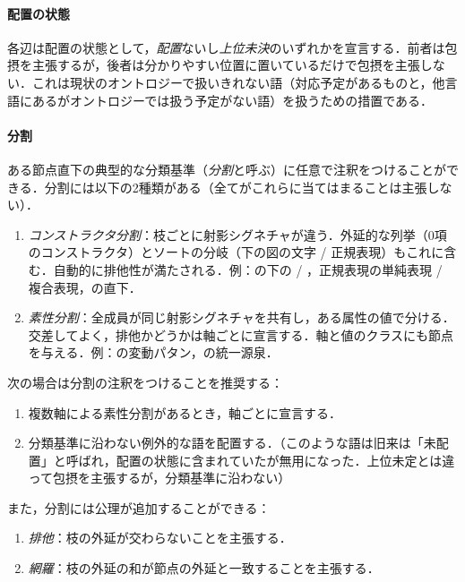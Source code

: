 \documentclass[../../main-detail.tex]{subfiles}
\begin{document}
\paragraph{配置の状態} 各辺は配置の状態として，\emph{配置}ないし\emph{上位未決}のいずれかを宣言する．前者は包摂を主張するが，後者は分かりやすい位置に置いているだけで包摂を主張しない．これは現状のオントロジーで扱いきれない語（対応予定があるものと，他言語にあるがオントロジーでは扱う予定がない語）を扱うための措置である．

\paragraph{分割} ある節点直下の典型的な分類基準（\emph{分割}と呼ぶ）に任意で注釈をつけることができる．分割には以下の2種類がある（全てがこれらに当てはまることは主張しない）．
\begin{enumerate}
    \item \emph{コンストラクタ分割}：枝ごとに射影シグネチャが違う．外延的な列挙（0項のコンストラクタ）とソートの分岐（下の図の文字 / 正規表現）もこれに含む．自動的に排他性が満たされる．例：の下の / ，正規表現の単純表現 / 複合表現，の直下．
    \item \emph{素性分割}：全成員が同じ射影シグネチャを共有し，ある属性の値で分ける．交差してよく，排他かどうかは軸ごとに宣言する．軸と値のクラスにも節点を与える．例：の変動パタン，の統一源泉．
\end{enumerate}
次の場合は分割の注釈をつけることを推奨する：
\begin{enumerate}
    \item 複数軸による素性分割があるとき，軸ごとに宣言する．
    \item 分類基準に沿わない例外的な語を配置する．（このような語は旧来は「未配置」と呼ばれ，配置の状態に含まれていたが無用になった．上位未定とは違って包摂を主張するが，分類基準に沿わない）
\end{enumerate}
また，分割には公理が追加することができる：
\begin{enumerate}
    \item \emph{排他}：枝の外延が交わらないことを主張する．
    \item \emph{網羅}：枝の外延の和が節点の外延と一致することを主張する．
\end{enumerate}

\end{document}

